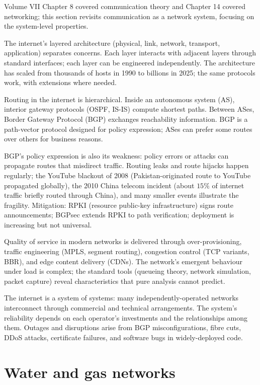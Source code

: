Volume VII Chapter 8 covered communication theory and Chapter 14 covered networking; this section revisits communication as a network system, focusing on the system-level properties.

The internet's layered architecture (physical, link, network, transport, application) separates concerns. Each layer interacts with adjacent layers through standard interfaces; each layer can be engineered independently. The architecture has scaled from thousands of hosts in 1990 to billions in 2025; the same protocols work, with extensions where needed.

Routing in the internet is hierarchical. Inside an autonomous system (AS), interior gateway protocols (OSPF, IS-IS) compute shortest paths. Between ASes, Border Gateway Protocol (BGP) exchanges reachability information. BGP is a path-vector protocol designed for policy expression; ASes can prefer some routes over others for business reasons.

BGP's policy expression is also its weakness: policy errors or attacks can propagate routes that misdirect traffic. Routing leaks and route hijacks happen regularly; the YouTube blackout of 2008 (Pakistan-originated route to YouTube propagated globally), the 2010 China telecom incident (about $15\%$ of internet traffic briefly routed through China), and many smaller events illustrate the fragility. Mitigation: RPKI (resource public-key infrastructure) signs route announcements; BGPsec extends RPKI to path verification; deployment is increasing but not universal.

Quality of service in modern networks is delivered through over-provisioning, traffic engineering (MPLS, segment routing), congestion control (TCP variants, BBR), and edge content delivery (CDNs). The network's emergent behaviour under load is complex; the standard tools (queueing theory, network simulation, packet capture) reveal characteristics that pure analysis cannot predict.

The internet is a system of systems: many independently-operated networks interconnect through commercial and technical arrangements. The system's reliability depends on each operator's investments and the relationships among them. Outages and disruptions arise from BGP misconfigurations, fibre cuts, DDoS attacks, certificate failures, and software bugs in widely-deployed code.

\section{Water and gas networks}

